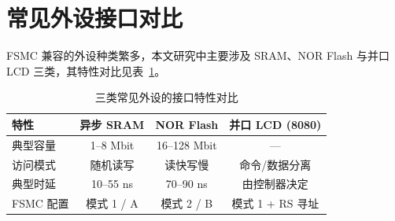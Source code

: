 \section{常见外设接口对比}
\label{sec:device_compare}

FSMC 兼容的外设种类繁多，本文研究中主要涉及 SRAM、NOR Flash 与并口
LCD 三类，其特性对比见表~\ref{tab:device_cmp}。

\begin{table}[htbp]
    \centering
    \caption{三类常见外设的接口特性对比}
    \label{tab:device_cmp}
    \begin{tabular}{lccc}
        \toprule
        特性 & 异步 SRAM & NOR Flash & 并口 LCD (8080) \\
        \midrule
        典型容量    & 1--8 Mbit & 16--128 Mbit & — \\
        访问模式    & 随机读写 & 读快写慢 & 命令/数据分离 \\
        典型时延    & 10--55 ns & 70--90 ns & 由控制器决定 \\
        FSMC 配置 & 模式 1 / A & 模式 2 / B & 模式 1 + RS 寻址 \\
        \bottomrule
    \end{tabular}
\end{table}
